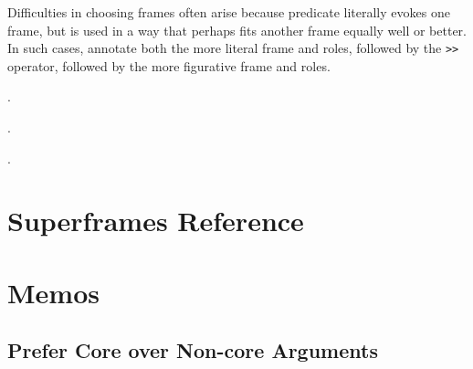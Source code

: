 \documentclass[a4paper]{article}
\begin{document}
Difficulties in choosing frames often arise because predicate literally evokes
one frame, but is used in a way that perhaps fits another frame equally well or
better. In such cases, annotate both the more literal frame and roles, followed
by the \texttt{>}\texttt{>} operator, followed by the more figurative frame and roles.

\ex.

\ex.

\ex.

\section{Superframes Reference}

\section{Memos}

\subsection{Prefer Core over Non-core Arguments}



\end{document}
